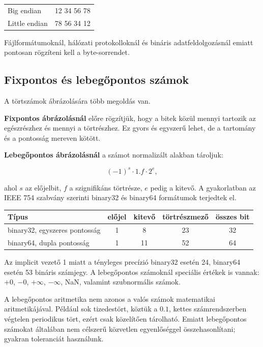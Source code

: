 \begin{center}
\begin{tabular}{l|c}
Big endian & 12 34 56 78 \\
Little endian & 78 56 34 12 \\
\end{tabular}
\end{center}

Fájlformátumoknál, hálózati protokolloknál és bináris adatfeldolgozásnál emiatt pontosan rögzíteni kell a byte-sorrendet.

\subsection{Fixpontos és lebegőpontos számok}

A törtszámok ábrázolására több megoldás van.

\textbf{Fixpontos ábrázolásnál} előre rögzítjük, hogy a bitek közül mennyi tartozik az egészrészhez és mennyi a törtrészhez. Ez gyors és egyszerű lehet, de a tartomány és a pontosság mereven kötött.

\textbf{Lebegőpontos ábrázolásnál} a számot normalizált alakban tároljuk:

\[
(-1)^s\cdot 1.f\cdot 2^e,
\]

ahol $s$ az előjelbit, $f$ a szignifikáns törtrésze, $e$ pedig a kitevő. A gyakorlatban az IEEE 754 szabvány szerinti binary32 és binary64 formátumok terjedtek el.

\begin{center}
\begin{tabular}{lcccc}
\toprule
Típus & előjel & kitevő & törtrészmező & összes bit \\
\midrule
binary32, egyszeres pontosság & 1 & 8 & 23 & 32 \\
binary64, dupla pontosság & 1 & 11 & 52 & 64 \\
\bottomrule
\end{tabular}
\end{center}

Az implicit vezető 1 miatt a tényleges precízió binary32 esetén 24, binary64 esetén 53 bináris számjegy. A lebegőpontos számoknál speciális értékek is vannak: $+0$, $-0$, $+\infty$, $-\infty$, NaN, valamint szubnormális számok.

\begin{warningbox}
A lebegőpontos aritmetika nem azonos a valós számok matematikai aritmetikájával. Például sok tizedestört, köztük a $0.1$, kettes számrendszerben végtelen periodikus tört, ezért csak közelítően tárolható. Emiatt lebegőpontos számokat általában nem célszerű közvetlen egyenlőséggel összehasonlítani; gyakran toleranciát használunk.
\end{warningbox}


